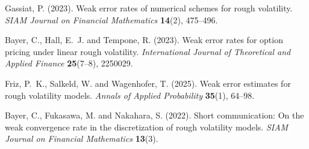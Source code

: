 

 Gassiat, P. (2023).
Weak error rates of numerical schemes for rough volatility.
\emph{SIAM Journal on Financial Mathematics} \textbf{14}(2), 475--496.

 Bayer, C., Hall, E.~J. and Tempone, R. (2023).
Weak error rates for option pricing under linear rough volatility.
\emph{International Journal of Theoretical and Applied Finance} \textbf{25}(7--8), 2250029.

 Friz, P.~K., Salkeld, W. and Wagenhofer, T. (2025).
Weak error estimates for rough volatility models.
\emph{Annals of Applied Probability} \textbf{35}(1), 64--98.

 Bayer, C., Fukasawa, M. and Nakahara, S. (2022).
Short communication: On the weak convergence rate in the discretization of
rough volatility models. \emph{SIAM Journal on Financial Mathematics} \textbf{13}(3).

